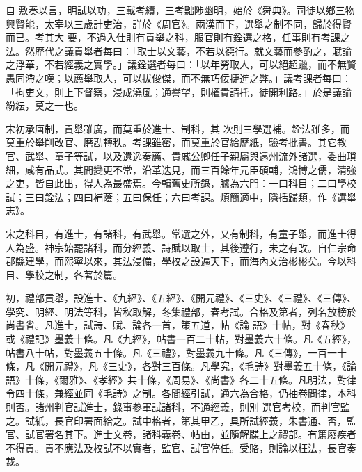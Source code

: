
\begin{pinyinscope}

 自
 敷奏以言，明試以功，三載考績，三考黜陟幽明，始於《舜典》。司徒以鄉三物興賢能，太宰以三歲計吏治，詳於《周官》。兩漢而下，選舉之制不同，歸於得賢而已。考其大
 要，不過入仕則有貢舉之科，服官則有銓選之格，任事則有考課之法。然歷代之議貢舉者每曰：「取士以文藝，不若以德行。就文藝而參酌之，賦論之浮華，不若經義之實學。」議銓選者每曰：「以年勞取人，可以絕超躐，而不無賢愚同滯之嘆；以薦舉取人，可以拔俊傑，而不無巧佞捷進之弊。」議考課者每曰：「拘吏文，則上下督察，浸成澆風；通譽望，則權貴請托，徒開利路。」於是議論紛紜，莫之一也。



 宋初承唐制，貢舉雖廣，而莫重於進士、制科，其
 次則三學選補。銓法雖多，而莫重於舉削改官、磨勘轉秩。考課雖密，而莫重於官給歷紙，驗考批書。其它教官、武舉、童子等試，以及遺逸奏薦、貴戚公卿任子親屬與遠州流外諸選，委曲瑣細，咸有品式。其間變更不常，沿革迭見，而三百餘年元臣碩輔，鴻博之儒，清強之吏，皆自此出，得人為最盛焉。今輯舊史所錄，臚為六門：一曰科目；二曰學校試；三曰銓法；四曰補蔭；五曰保任；六曰考課。煩簡適中，隱括歸類，作《選舉志》。



 宋之科目，有進士，有諸科，有武舉。常選之外，又有制科，有童子舉，而進士得人為盛。神宗始罷諸科，而分經義、詩賦以取士，其後遵行，未之有改。自仁宗命郡縣建學，而熙寧以來，其法浸備，學校之設遍天下，而海內文治彬彬矣。今以科目、學校之制，各著於篇。



 初，禮部貢舉，設進士、《九經》、《五經》、《開元禮》、《三史》、《三禮》、《三傳》、學究、明經、明法等科，皆秋取解，冬集禮部，春考試。合格及第者，列名放榜於尚書省。凡進士，試詩、賦、論各一首，策五道，帖《論
 語》十帖，對《春秋》或《禮記》墨義十條。凡《九經》，帖書一百二十帖，對墨義六十條。凡《五經》，帖書八十帖，對墨義五十條。凡《三禮》，對墨義九十條。凡《三傳》，一百一十條，凡《開元禮》，凡《三史》，各對三百條。凡學究，《毛詩》對墨義五十條，《論語》十條，《爾雅》、《孝經》共十條，《周易》、《尚書》各二十五條。凡明法，對律令四十條，兼經並同《毛詩》之制。各間經引試，通六為合格，仍抽卷問律，本科則否。諸州判官試進士，錄事參軍試諸科，不通經義，則別
 選官考校，而判官監之。試紙，長官印署面給之。試中格者，第其甲乙，具所試經義，朱書通、否，監官、試官署名其下。進士文卷，諸科義卷、帖由，並隨解牒上之禮部。有篤廢疾者不得貢。貢不應法及校試不以實者，監官、試官停任。受賂，則論以枉法，長官奏裁。




\end{pinyinscope}
